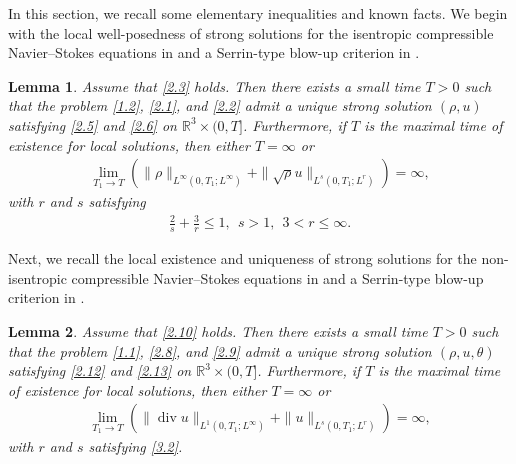 \documentclass[11pt]{article}
\newtheorem{Lemma}{Lemma}[section]
\DeclareMathOperator{\divv}{div}
\begin{document}
In this section, we recall some elementary inequalities and known facts.
We begin with the local well-posedness of strong solutions for the isentropic compressible Navier--Stokes equations in \cite{Hu2020} and a Serrin-type blow-up criterion in \cite{HLX11}.
\begin{Lemma}\label{lem3.1}
Assume that \eqref{2.3} holds. Then there exists a small time $T>0$ such that the  problem \eqref{1.2}, \eqref{2.1}, and \eqref{2.2} admit a unique strong solution $(\rho,u)$ satisfying \eqref{2.5} and \eqref{2.6} on $\mathbb{R}^3 \times (0, T]$.
Furthermore, if $T$ is the maximal time of existence for local solutions, then either $T=\infty$ or
\begin{align}\label{3.1}
\lim _{T_1 \rightarrow T}\left(\|\rho\|_{L^\infty(0, T_1;L^{\infty})}
+\|\sqrt{\rho}u\|_{L^s(0, T_1; L^r)}\right) = \infty,
\end{align}
with $r$ and $s$ satisfying
\begin{align}\label{3.2}
\frac{2}{s}+\frac{3}{r} \leq 1, \ \ s>1,\ \ 3<r \leq \infty.
\end{align}
\end{Lemma}

Next, we recall the local existence and uniqueness of strong solutions for the non-isentropic compressible Navier--Stokes equations in \cite{LZ2023} and a Serrin-type blow-up criterion in \cite{HLW13}.
\begin{Lemma}\label{lem3.2}
Assume that \eqref{2.10} holds. Then there exists a small time $T>0$ such that the problem \eqref{1.1}, \eqref{2.8}, and \eqref{2.9} admit a unique strong solution $(\rho,u,\theta)$ satisfying \eqref{2.12} and \eqref{2.13} on $\mathbb{R}^3\times (0, T]$. Furthermore, if $T$ is the maximal time of existence for local solutions, then either $T=\infty$ or
\begin{align}\label{3.3}
\lim _{T_1 \rightarrow T}\left(\|\divv u\|_{L^1(0, T_1;L^{\infty})}
+\|u\|_{L^s(0, T_1; L^r)}\right) = \infty,
\end{align}
with $r$ and $s$ satisfying \eqref{3.2}.
\end{Lemma}
\end{document}
